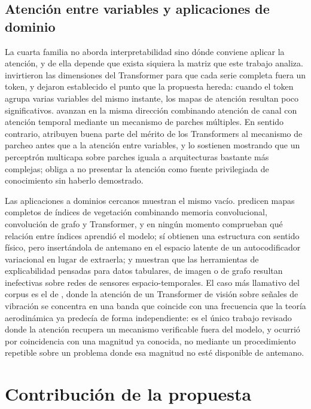 \subsection{Atención entre variables y aplicaciones de dominio}

La cuarta familia no aborda interpretabilidad sino dónde conviene aplicar la atención, y de ella depende que exista siquiera la matriz que este trabajo analiza. \textcite{liu2024itransformer} invirtieron las dimensiones del Transformer para que cada serie completa fuera un token, y dejaron establecido el punto que la propuesta hereda: cuando el token agrupa varias variables del mismo instante, los mapas de atención resultan poco significativos. \textcite{sentinel2025multipatch} avanzan en la misma dirección combinando atención de canal con atención temporal mediante un mecanismo de parches múltiples. En sentido contrario, \textcite{patchmlp2025unlocking} atribuyen buena parte del mérito de los Transformers al mecanismo de parcheo antes que a la atención entre variables, y lo sostienen mostrando que un perceptrón multicapa sobre parches iguala a arquitecturas bastante más complejas; obliga a no presentar la atención como fuente privilegiada de conocimiento sin haberlo demostrado.

Las aplicaciones a dominios cercanos muestran el mismo vacío. \textcite{convlstmgcn2026vegetation} predicen mapas completos de índices de vegetación combinando memoria convolucional, convolución de grafo y Transformer, y en ningún momento comprueban qué relación entre índices aprendió el modelo; \textcite{teleconnections2026causal} sí obtienen una estructura con sentido físico, pero insertándola de antemano en el espacio latente de un autocodificador variacional en lugar de extraerla; y \textcite{spatiotemporal2024e2e} muestran que las herramientas de explicabilidad pensadas para datos tabulares, de imagen o de grafo resultan inefectivas sobre redes de sensores espacio-temporales. El caso más llamativo del corpus es el de \textcite{rotorcraft2026vortexring}, donde la atención de un Transformer de visión sobre señales de vibración se concentra en una banda que coincide con una frecuencia que la teoría aerodinámica ya predecía de forma independiente: es el único trabajo revisado donde la atención recupera un mecanismo verificable fuera del modelo, y ocurrió por coincidencia con una magnitud ya conocida, no mediante un procedimiento repetible sobre un problema donde esa magnitud no esté disponible de antemano.

\section{Contribución de la propuesta}

